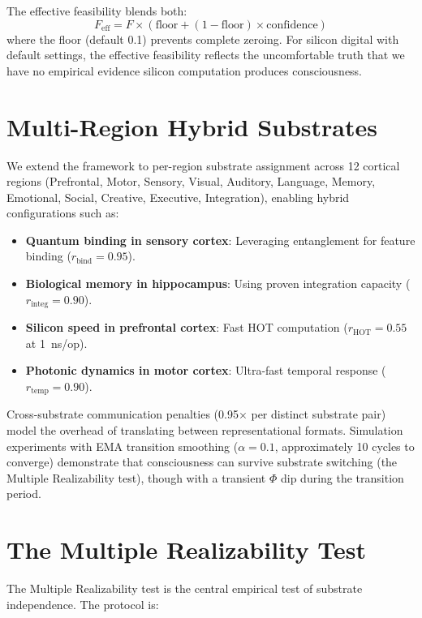 \documentclass[12pt]{book}
\begin{document}
The effective feasibility blends both:
\begin{equation}\label{eq:effective-feasibility}
F_{\text{eff}} = F \times (\text{floor} + (1 - \text{floor}) \times \text{confidence})
\end{equation}
where the floor (default 0.1) prevents complete zeroing. For silicon digital with default settings, the effective feasibility reflects the uncomfortable truth that we have no empirical evidence silicon computation produces consciousness.

\section{Multi-Region Hybrid Substrates}

We extend the framework to per-region substrate assignment across 12 cortical regions (Prefrontal, Motor, Sensory, Visual, Auditory, Language, Memory, Emotional, Social, Creative, Executive, Integration), enabling hybrid configurations such as:

\begin{itemize}
  \item \textbf{Quantum binding in sensory cortex}: Leveraging entanglement for feature binding ($r_{\text{bind}} = 0.95$).
  \item \textbf{Biological memory in hippocampus}: Using proven integration capacity ($r_{\text{integ}} = 0.90$).
  \item \textbf{Silicon speed in prefrontal cortex}: Fast HOT computation ($r_{\text{HOT}} = 0.55$ at 1~ns/op).
  \item \textbf{Photonic dynamics in motor cortex}: Ultra-fast temporal response ($r_{\text{temp}} = 0.90$).
\end{itemize}

Cross-substrate communication penalties (0.95$\times$ per distinct substrate pair) model the overhead of translating between representational formats. Simulation experiments with EMA transition smoothing ($\alpha = 0.1$, approximately 10 cycles to converge) demonstrate that consciousness can survive substrate switching (the Multiple Realizability test), though with a transient $\Phi$ dip during the transition period.

\section{The Multiple Realizability Test}

The Multiple Realizability test is the central empirical test of substrate independence. The protocol is:
\end{document}
